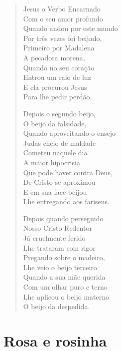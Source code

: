 \begin{verse}
Jesus o Verbo Encarnado\\
Com o seu amor profundo\\
Quando andou por este mundo\\
Por três vezes foi beijado,\\
Primeiro por Madalena\\
A pecadora morena,\\
Quando no seu coração\\
Entrou um raio de luz\\
E ela procurou Jesus\\
Para lhe pedir perdão.

Depois o segundo beijo,\\
O beijo da falsidade,\\
Quando aproveitando o ensejo\\
Judas cheio de maldade\\
Cometeu naquele dia\\
A maior hipocrisia\\
Que pode haver contra Deus,\\
De Cristo se aproximou\\
E em sua face beijou\\
Lhe entregando aos fariseus.

Depois quando perseguido\\
Nosso Cristo Redentor\\
Já cruelmente ferido\\
Lhe trataram com rigor\\
Pregando sobre o madeiro,\\
Lhe veio o beijo terceiro\\
Quando a sua mãe querida\\
Com um olhar puro e terno\\
Lhe aplicou o beijo materno\\
O beijo da despedida.
\end{verse}

\chapter{Rosa e rosinha}

